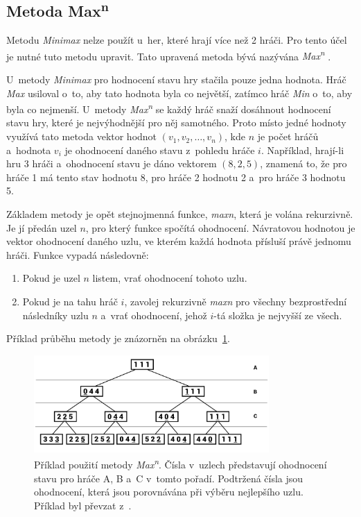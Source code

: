 \subsection*{Metoda Max\textsuperscript{n}}

Metodu \emph{Minimax} nelze použít u~her, které hrají více než 2 hráči. Pro tento účel je nutné tuto metodu upravit. Tato upravená metoda bývá nazývána \emph{Max\textsuperscript{n}} \cite{Maxn}.

U~metody \emph{Minimax} pro hodnocení stavu hry stačila pouze jedna hodnota. Hráč \emph{Max} usiloval o~to, aby tato hodnota byla co největší, zatímco hráč \emph{Min} o~to, aby byla co nejmenší. U~metody \emph{Max\textsuperscript{n}} se každý hráč snaží dosáhnout hodnocení stavu hry, které je nejvýhodnější pro něj samotného. Proto místo jedné hodnoty využívá tato metoda vektor hodnot $(v_1, v_2, \ldots, v_n)$, kde $n$ je počet hráčů a~hodnota $v_i$ je ohodnocení daného stavu z~pohledu hráče $i$. Například, hrají-li hru 3 hráči a~ohodnocení stavu je dáno vektorem $(8, 2, 5)$, znamená to, že pro hráče 1 má tento stav hodnotu 8, pro hráče 2 hodnotu 2 a~pro hráče 3 hodnotu 5.

Základem metody je opět stejnojmenná funkce, \emph{maxn}, která je volána rekurzivně. Je jí předán uzel $n$, pro který funkce spočítá ohodnocení. Návratovou hodnotou je vektor ohodnocení daného uzlu, ve kterém každá hodnota přísluší právě jednomu hráči. Funkce vypadá následovně:
\begin{enumerate}
    \item Pokud je uzel $n$ listem, vrať ohodnocení tohoto uzlu.
    \item Pokud je na tahu hráč $i$, zavolej rekurzivně \emph{maxn} pro všechny bezprostřední následníky uzlu $n$ a~vrať ohodnocení, jehož $i$-tá složka je nejvyšší ze všech.
\end{enumerate}
Příklad průběhu metody je znázorněn na obrázku~\ref{fig:maxn}.

\begin{figure}[ht]
    \centering
    \includegraphics[width=0.8\textwidth]{obrazky-figures/maxn.pdf}
    \caption{Příklad použití metody \emph{Max\textsuperscript{n}}. Čísla v~uzlech představují ohodnocení stavu pro hráče A, B a~C v~tomto pořadí. Podtržená čísla jsou ohodnocení, která jsou porovnávána při výběru nejlepšího uzlu. Příklad byl převzat z~\cite{Maxn}.}
    \label{fig:maxn}
\end{figure}

